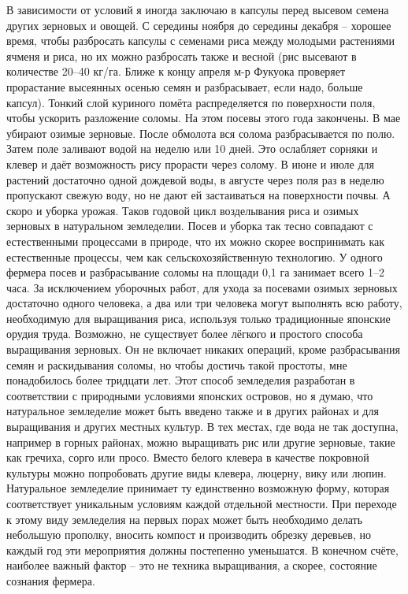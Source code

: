 \documentclass[a4paper]{book}
\begin{document}
В зависимости от условий я иногда заключаю в капсулы перед высевом семена других
зерновых и овощей.
С середины ноября до середины декабря – хорошее время, чтобы разбросать капсулы с
семенами риса между молодыми растениями ячменя и риса, но их можно разбросать также и
весной (рис высевают в количестве 20–40 кг/га. Ближе к концу апреля м-р Фукуока
проверяет прорастание высеянных осенью семян и разбрасывает, если надо, больше капсул).
Тонкий слой куриного помёта распределяется по поверхности поля, чтобы ускорить
разложение соломы. На этом посевы этого года закончены.
В мае убирают озимые зерновые. После обмолота вся солома разбрасывается по полю.
Затем поле заливают водой на неделю или 10 дней. Это ослабляет сорняки и клевер и
даёт возможность рису прорасти через солому.
В июне и июле для растений достаточно одной дождевой воды, в августе через поля раз
в неделю пропускают свежую воду, но не дают ей застаиваться на поверхности почвы. А
скоро и уборка урожая.
Таков годовой цикл возделывания риса и озимых зерновых в натуральном земледелии.
Посев и уборка так тесно совпадают с естественными процессами в природе, что их можно
скорее воспринимать как естественные процессы, чем как сельскохозяйственную
технологию.
У одного фермера посев и разбрасывание соломы на площади 0,1 га занимает всего 1–2
часа. За исключением уборочных работ, для ухода за посевами озимых зерновых достаточно
одного человека, а два или три человека могут выполнять всю работу, необходимую для
выращивания риса, используя только традиционные японские орудия труда. Возможно, не
существует более лёгкого и простого способа выращивания зерновых. Он не включает
никаких операций, кроме разбрасывания семян и раскидывания соломы, но чтобы достичь
такой простоты, мне понадобилось более тридцати лет.
Этот способ земледелия разработан в соответствии с природными условиями японских
островов, но я думаю, что натуральное земледелие может быть введено также и в других
районах и для выращивания и других местных культур. В тех местах, где вода не так
доступна, например в горных районах, можно выращивать рис или другие зерновые, такие
как гречиха, сорго или просо. Вместо белого клевера в качестве покровной культуры можно
попробовать другие виды клевера, люцерну, вику или люпин. Натуральное земледелие
принимает ту единственно возможную форму, которая соответствует уникальным условиям
каждой отдельной местности.
При переходе к этому виду земледелия на первых порах может быть необходимо делать
небольшую прополку, вносить компост и производить обрезку деревьев, но каждый год эти
мероприятия должны постепенно уменьшатся. В конечном счёте, наиболее важный фактор –
это не техника выращивания, а скорее, состояние сознания фермера.
\end{document}
